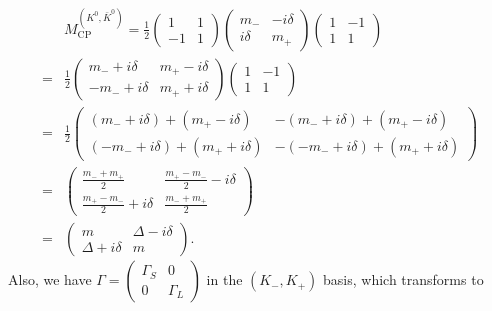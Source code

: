 \begin{align}
    &M_{\text{CP}}^{(K^0, \bar{K}^0)} = \frac{1}{2}\begin{pmatrix}
    1 & 1 \\
    -1 & 1
    \end{pmatrix} \begin{pmatrix}
    m_- & -i \delta \\
    i \delta & m_+
    \end{pmatrix} \begin{pmatrix}
    1 & -1 \\
    1 & 1
    \end{pmatrix}\\
    =& \frac{1}{2}
    \begin{pmatrix}
        m_-+i\delta & m_+-i\delta \\
        -m_-+i\delta & m_+ +i\delta
    \end{pmatrix} 
    \begin{pmatrix}
    1 & -1 \\
    1 & 1
    \end{pmatrix}\\
    =& \frac{1}{2}
    \begin{pmatrix}
        (m_-+i\delta) + (m_+-i\delta) & -(m_-+i\delta) + (m_+-i\delta) \\
        (-m_-+i\delta) + (m_+ + i\delta) & -(-m_-+i\delta) + (m_+ + i\delta)
    \end{pmatrix}\\
    =& \begin{pmatrix}
    \frac{m_- + m_+}{2} & \frac{m_+ - m_-}{2} - i\delta \\
    \frac{m_+ - m_-}{2} + i\delta & \frac{m_- + m_+}{2}
    \end{pmatrix}\\
    =& \begin{pmatrix}
    m & \Delta - i\delta \\
    \Delta + i\delta & m
    \end{pmatrix}.
\end{align}
Also, we have $\Gamma = \begin{pmatrix}
    \Gamma_S & 0 \\
    0 & \Gamma_L
\end{pmatrix}$ in the $(K_-, K_+)$ basis, which transforms to
